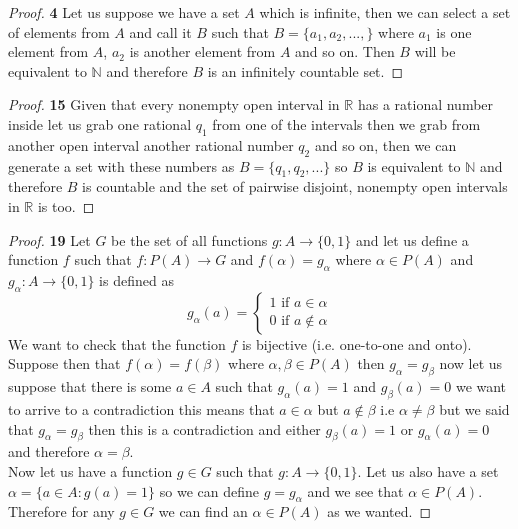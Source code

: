 \documentclass[11pt]{article}
\newcommand{\N}{\mathbb{N}}
\newcommand{\R}{\mathbb{R}}
\theoremstyle{definition}
\begin{document}
	\begin{proof}{\textbf{4}}
        Let us suppose we have a set $A$ which is infinite, then we can select a set of
        elements from $A$ and call it $B$ such that $B = \{a_1, a_2, ..., \}$ where 
        $a_1$ is one element from $A$, $a_2$ is another element from $A$ and so on.
        Then $B$ will be equivalent to $\N$ and therefore $B$ is an infinitely countable
        set.
    \end{proof}
	\begin{proof}{\textbf{15}}
        Given that every nonempty open interval in $\R$ has a rational number inside
        let us grab one rational $q_1$ from one of the intervals then we grab from
        another open interval another rational number $q_2$ and so on, then we can
        generate a set with these numbers as $B = \{q_1, q_2, ...\}$ so $B$ is
        equivalent to $\N$ and therefore $B$ is countable and the set of pairwise
        disjoint, nonempty open intervals in $\R$ is too.
    \end{proof}
\cleardoublepage
	\begin{proof}{\textbf{19}}
        Let $G$ be the set of all functions $g:A \rightarrow \{0,1\}$ and let us define
        a function $f$ such that $f:P(A) \rightarrow G$ and $f(\alpha) = g_{\alpha}$
        where $\alpha \in P(A)$ and $g_{\alpha}: A \rightarrow \{0,1\}$ is defined as
        \begin{equation*}
            g_\alpha(a) =
            \begin{cases}
                1 \text{ if } a \in \alpha\\
                0 \text{ if } a \notin \alpha
            \end{cases}             
        \end{equation*}
        We want to check that the function $f$ is bijective (i.e. one-to-one and onto).\\
        Suppose then that $f(\alpha) = f(\beta)$ where $\alpha, \beta \in P(A)$ then
        $g_{\alpha} = g_{\beta}$ now let us suppose that there is some $a \in A$ such
        that $g_{\alpha}(a) = 1$ and $g_{\beta}(a) = 0$ we want to arrive to
        a contradiction this means that $a \in \alpha$ but $a \notin \beta$ i.e
        $\alpha \neq \beta$ but we said
        that $g_{\alpha} = g_{\beta}$ then this is a contradiction and either
        $g_{\beta}(a) = 1$ or $g_{\alpha}(a) = 0$ and therefore $\alpha = \beta$.\\
        Now let us have a function $g \in G$ such that $g:A \rightarrow \{0,1\}$. Let us
        also have a set $\alpha = \{a \in A: g(a) = 1\}$ so we can define
        $g = g_{\alpha}$ and we see that  $\alpha \in P(A)$. Therefore for any $g \in G$
        we can find an $\alpha \in P(A)$ as we wanted. 
    \end{proof}
\end{document}

